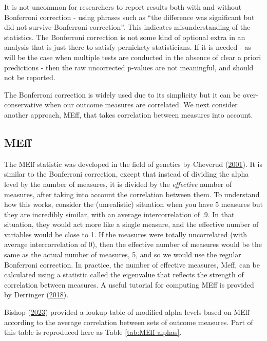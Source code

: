 \documentclass{krantz}
\begin{document}
It is not uncommon for researchers to report results both with and without Bonferroni correction - using phrases such as ``the difference was significant but did not survive Bonferroni correction''. This indicates misunderstanding of the statistics. The Bonferroni correction is not some kind of optional extra in an analysis that is just there to satisfy pernickety statisticians. If it is needed - as will be the case when multiple tests are conducted in the absence of clear a priori predictions - then the raw uncorrected p-values are not meaningful, and should not be reported.

The Bonferroni correction is widely used due to its simplicity but it can be over-conservative when our outcome measures are correlated. We next consider another approach, MEff, that takes correlation between measures into account.

\hypertarget{meff}{%
\subsection{MEff}\label{meff}}

The MEff statistic was developed in the field of genetics by Cheverud (\protect\hyperlink{ref-cheverud2001}{2001}). It is similar to the Bonferroni correction, except that instead of dividing the alpha level by the number of measures, it is divided by the \emph{effective} number of measures, after taking into account the correlation between them. To understand how this works, consider the (unrealistic) situation when you have 5 measures but they are incredibly similar, with an average intercorrelation of .9. In that situation, they would act more like a single measure, and the effective number of variables would be close to 1. If the measures were totally uncorrelated (with average intercorrelation of 0), then the effective number of measures would be the same as the actual number of measures, 5, and so we would use the regular Bonferroni correction. In practice, the number of effective measures, Meff, can be calculated using a statistic called the eigenvalue that reflects the strength of correlation between measures. A useful tutorial for computing MEff is provided by Derringer (\protect\hyperlink{ref-derringer2018a}{2018}).

Bishop (\protect\hyperlink{ref-bishop2023b}{2023}) provided a lookup table of modified alpha levels based on MEff according to the average correlation between sets of outcome measures. Part of this table is reproduced here as Table \ref{tab:MEff-alphas}.
\end{document}
